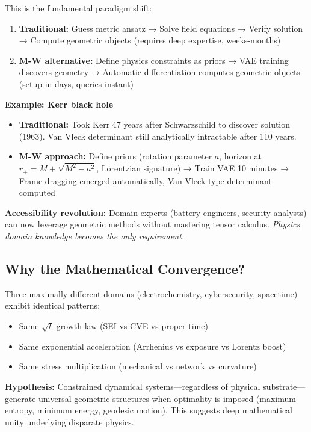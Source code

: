 \documentclass[11pt,a4paper]{article}
\begin{document}
This is the fundamental paradigm shift:
\begin{enumerate}
\item \textbf{Traditional:} Guess metric ansatz → Solve field equations → Verify solution → Compute geometric objects (requires deep expertise, weeks-months)
\item \textbf{M-W alternative:} Define physics constraints as priors → VAE training discovers geometry → Automatic differentiation computes geometric objects (setup in days, queries instant)
\end{enumerate}

\textbf{Example: Kerr black hole}
\begin{itemize}
\item \textbf{Traditional:} Took Kerr 47 years after Schwarzschild to discover solution (1963). Van Vleck determinant still analytically intractable after 110 years.
\item \textbf{M-W approach:} Define priors (rotation parameter $a$, horizon at $r_+ = M + \sqrt{M^2-a^2}$, Lorentzian signature) → Train VAE 10 minutes → Frame dragging emerged automatically, Van Vleck-type determinant computed
\end{itemize}

\textbf{Accessibility revolution:} Domain experts (battery engineers, security analysts) can now leverage geometric methods without mastering tensor calculus. \emph{Physics domain knowledge becomes the only requirement.}

\subsection{Why the Mathematical Convergence?}

Three maximally different domains (electrochemistry, cybersecurity, spacetime) exhibit identical patterns:

\begin{itemize}
\item Same $\sqrt{t}$ growth law (SEI vs CVE vs proper time)
\item Same exponential acceleration (Arrhenius vs exposure vs Lorentz boost)
\item Same stress multiplication (mechanical vs network vs curvature)
\end{itemize}

\textbf{Hypothesis:} Constrained dynamical systems—regardless of physical substrate—generate universal geometric structures when optimality is imposed (maximum entropy, minimum energy, geodesic motion). This suggests deep mathematical unity underlying disparate physics.
\end{document}

